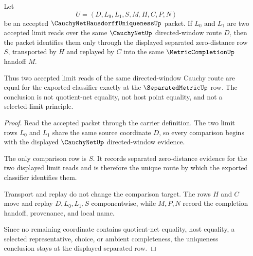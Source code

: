 \begin{theorem}
\label{thm:cauchy-net-hausdorff-limit-separation}
Let
$$
U=(D,L_0,L_1,S,M,H,C,P,N)
$$
be an accepted $\CauchyNetHausdorffUniquenessUp$ packet. If $L_0$ and $L_1$ are two accepted limit reads over the same $\CauchyNetUp$ directed-window route $D$, then the packet identifies them only through the displayed separated zero-distance row $S$, transported by $H$ and replayed by $C$ into the same $\MetricCompletionUp$ handoff $M$.

Thus two accepted limit reads of the same directed-window Cauchy route are equal for the exported classifier exactly at the $\SeparatedMetricUp$ row. The conclusion is not quotient-net equality, not host point equality, and not a selected-limit principle.
\end{theorem}
\begin{proof}
Read the accepted packet through the carrier definition. The two limit rows $L_0$ and $L_1$ share the same source coordinate $D$, so every comparison begins with the displayed $\CauchyNetUp$ directed-window evidence.

The only comparison row is $S$. It records separated zero-distance evidence for the two displayed limit reads and is therefore the unique route by which the exported classifier identifies them.

Transport and replay do not change the comparison target. The rows $H$ and $C$ move and replay $D,L_0,L_1,S$ componentwise, while $M,P,N$ record the completion handoff, provenance, and local name.

Since no remaining coordinate contains quotient-net equality, host equality, a selected representative, choice, or ambient completeness, the uniqueness conclusion stays at the displayed separated row.
\end{proof}


